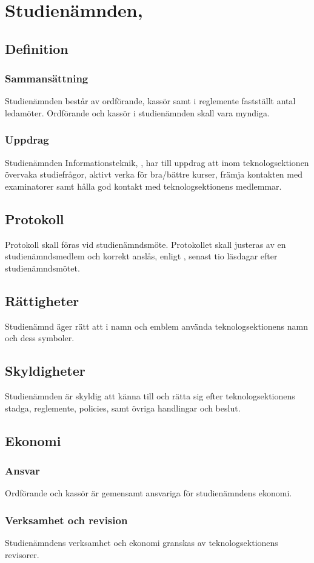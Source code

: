 \section{Studienämnden, \SNIT}

\subsection{Definition}

\subsubsection{Sammansättning}
Studienämnden består av ordförande, kassör samt i reglemente fastställt antal
ledamöter. Ordförande och kassör i studienämnden skall vara myndiga.

\subsubsection{Uppdrag}
Studienämnden Informationsteknik, \SNIT{}, har till uppdrag att inom teknologsektionen övervaka studiefrågor, aktivt verka för bra/bättre kurser, främja kontakten med examinatorer samt hålla god kontakt med teknologsektionens medlemmar.

\subsection{Protokoll}
Protokoll skall föras vid studienämndsmöte. Protokollet skall justeras av en studienämndsmedlem och korrekt anslås, enligt , senast tio läsdagar efter studienämndsmötet.

\subsection{Rättigheter}
Studienämnd äger rätt att i namn och emblem använda teknologsektionens namn och dess symboler.

\subsection{Skyldigheter}
Studienämnden är skyldig att känna till och rätta sig efter teknologsektionens stadga, reglemente, policies, samt övriga handlingar och beslut.

\subsection{Ekonomi}
\subsubsection{Ansvar}
Ordförande och kassör är gemensamt ansvariga för studienämndens ekonomi.
\subsubsection{Verksamhet och revision}
Studienämndens verksamhet och ekonomi granskas av teknologsektionens revisorer.